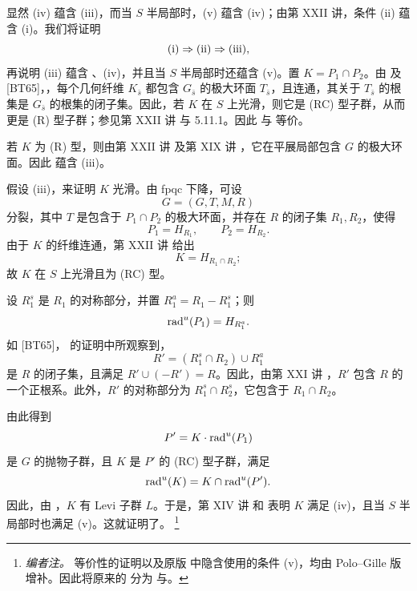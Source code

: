 \SGAProof
显然 (iv) 蕴含 (iii)，而当 \(S\) 半局部时，(v) 蕴含 (iv)；由第 XXII 讲，条件 (ii) 蕴含 (i)。我们将证明
\[
 \textup{(i)}\Rightarrow\textup{(ii)}
 \Rightarrow\textup{(iii)},
\]
再说明 (iii) 蕴含 \textup{}、(iv)，并且当 \(S\) 半局部时还蕴含 (v)。置 \(K=P_1\cap P_2\)。由  及 \textup{[BT65]}，，每个几何纤维 \(K_{\bar s}\) 都包含 \(G_{\bar s}\) 的极大环面 \(T_{\bar s}\)，且连通，其关于 \(T_{\bar s}\) 的根集是 \(G_{\bar s}\) 的根集的闭子集。因此，若 \(K\) 在 \(S\) 上光滑，则它是 \textup{(RC)} 型子群，从而更是 \textup{(R)} 型子群；参见第 XXII 讲  与 5.11.1。因此 \textup{} 与 \textup{} 等价。

若 \(K\) 为 \textup{(R)} 型，则由第 XXII 讲  及第 XIX 讲 ，它在平展局部包含 \(G\) 的极大环面。因此 \textup{} 蕴含 (iii)。

假设 (iii)，来证明 \(K\) 光滑。由 fpqc 下降，可设
\[
 G=(G,T,M,R)
\]
分裂，其中 \(T\) 是包含于 \(P_1\cap P_2\) 的极大环面，并存在 \(R\) 的闭子集 \(R_1,R_2\)，使得
\[
 P_1=H_{R_1},\qquad P_2=H_{R_2}.
\]
由于 \(K\) 的纤维连通，第 XXII 讲  给出
\[
 K=H_{R_1\cap R_2};
\]
故 \(K\) 在 \(S\) 上光滑且为 \textup{(RC)} 型。

设 \(R_1^s\) 是 \(R_1\) 的对称部分，并置 \(R_1^a=R_1-R_1^s\)；则
\[
 \operatorname{rad}^u(P_1)=H_{R_1^a}.
\]
如 \textup{[BT65]}， 的证明中所观察到，
\[
 R'=(R_1^s\cap R_2)\cup R_1^a
\]
是 \(R\) 的闭子集，且满足 \(R'\cup(-R')=R\)。因此，由第 XXI 讲 ，\(R'\) 包含 \(R\) 的一个正根系。此外，\(R'\) 的对称部分为 \(R_1^s\cap R_2^s\)，它包含于 \(R_1\cap R_2\)。

由此得到
\[
 P'=K\cdot\operatorname{rad}^u(P_1)
\]
是 \(G\) 的抛物子群，且 \(K\) 是 \(P'\) 的 \textup{(RC)} 型子群，满足
\[
 \operatorname{rad}^u(K)=K\cap\operatorname{rad}^u(P').
\]
因此，由 ，\(K\) 有 Levi 子群 \(L\)。于是，第 XIV 讲  和  表明 \(K\) 满足 (iv)，且当 \(S\) 半局部时也满足 (v)。这就证明了。
\SGAQED
\footnote{\emph{编者注。} 等价性的证明以及原版  中隐含使用的条件 (v)，均由 Polo--Gille 版增补。因此将原来的  分为 与。}

